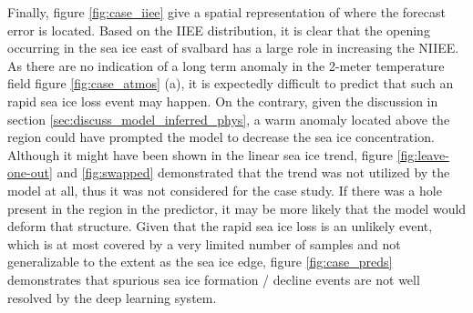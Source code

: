 \documentclass[../main/thesis]{subfiles}
\begin{document}
Finally, figure \ref{fig:case_iiee} give a spatial representation of where the forecast error is located. Based on the IIEE distribution, it is clear that the opening occurring in the sea ice east of svalbard has a large role in increasing the NIIEE. As there are no indication of a long term anomaly in the 2-meter temperature field figure \ref{fig:case_atmos} (a), it is expectedly difficult to predict that such an rapid sea ice loss event may happen. On the contrary, given the discussion in section \ref{sec:discuss_model_inferred_phys}, a warm anomaly located above the region could have prompted the model to decrease the sea ice concentration. Although it might have been shown in the linear sea ice trend, figure \ref{fig:leave-one-out} and \ref{fig:swapped} demonstrated that the trend was not utilized by the model at all, thus it was not considered for the case study. If there was a hole present in the region in the predictor, it may be more likely that the model would deform that structure. Given that the rapid sea ice loss is an unlikely event, which is at most covered by a very limited number of samples and not generalizable to the extent as the sea ice edge, figure \ref{fig:case_preds} demonstrates that spurious sea ice formation / decline events are not well resolved by the deep learning system.




\biblio
\end{document}
